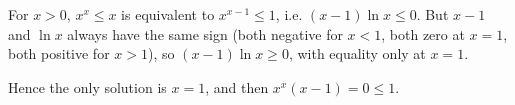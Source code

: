 For $x>0$, $x^x\le x$ is equivalent to $x^{x-1}\le1$, i.e. $(x-1)\ln x\le0$. But $x-1$ and $\ln x$ always have the same sign (both negative for $x<1$, both zero at $x=1$, both positive for $x>1$), so $(x-1)\ln x\ge0$, with equality only at $x=1$.

Hence the only solution is $\boxed{x=1}$, and then $x^x(x-1)=0\le1$.
